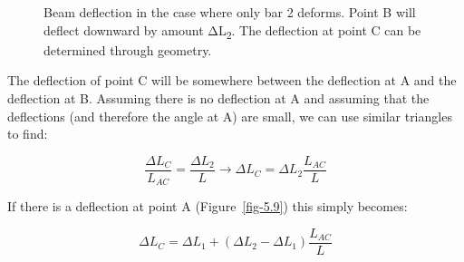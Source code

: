 \documentclass[
  letterpaper,
  DIV=11,
  numbers=noendperiod]{scrreprt}
\theoremstyle{definition}
\theoremstyle{remark}
\begin{document}
\begin{figure}


\caption{\label{fig-5.8}Beam deflection in the case where only bar 2
deforms. Point B will deflect downward by amount ΔL\textsubscript{2}.
The deflection at point C can be determined through geometry.}

\end{figure}%

The deflection of point C will be somewhere between the deflection at A
and the deflection at B. Assuming there is no deflection at A and
assuming that the deflections (and therefore the angle at A) are small,
we can use similar triangles to find:

\[
\frac{\Delta L_C}{L_{A C}}=\frac{\Delta L_2}{L} \rightarrow \Delta L_C=\Delta L_2 \frac{L_{A C}}{L}\]

If there is a deflection at point A (Figure~\ref{fig-5.9}) this simply
becomes:

\[
\Delta L_C=\Delta L_1+\left(\Delta L_2-\Delta L_1\right) \frac{L_{A C}}{L}\]
\end{document}
